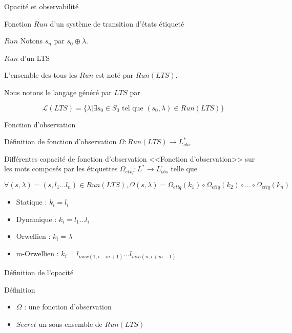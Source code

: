 \documentclass[11pt]{beamer}
\begin{document}
\begin{section}{Opacit\'e et observabilit\'e}
\begin{frame}{Fonction $Run$ d'un syst\`eme de transition d'\'etats \'etiquet\'e}
\begin{block}{$Run$}
	Notons $s_n$ par $s_0\oplus \lambda$.
    \end{block}
    
    \begin{block}{$Run$ d'un LTS}

	L'ensemble des tous les $Run$ est not\'e par $Run(LTS)$.

	Nous notons le langage g\'en\'er\'e par $LTS$ par 

	$$\mathcal{L}(LTS) = \{\lambda | \exists s_0 \in S_0 \mbox{ tel que } (s_0,\lambda) \in Run(LTS)\}$$
   
    \end{block}
  \end{frame}
  
  \begin{frame}{Fonction d'observation}
    \begin{block}{D\'efinition de fonction d'observation}
      $\Omega : Run(LTS) \rightarrow L_{obs}^*$
    \end{block}
    
    \begin{block}{Diff\'erentes capacit\'e de fonction d'observation}
     <<Fonction d'observation>> sur les mots compos\'es par les \'etiquettes $\Omega_{etiq} : L^* \rightarrow L_{obs}^{\varepsilon}$ telle que 
	
	$\forall (s,\lambda)= (s,l_1\dots l_n) \in Run(LTS), \Omega(s,\lambda) = \Omega_{etiq}(k_1)\circ\Omega_{etiq}(k_2)\circ\dots\circ\Omega_{etiq}(k_n)$

      \begin{itemize}
        \item Statique : $k_i = l_i$
	\item Dynamique : $k_i = l_1 \dots l_i$
	\item Orwellien : $k_i = \lambda$
	\item m-Orwellien : $k_i = l_{max(1,i-m+1)} \dots l_{min(n,i+m-1)}$

      \end{itemize}
    \end{block}   
   
  \end{frame}
  
  \begin{frame}{D\'efinition de l'opacit\'e}
    \begin{block}{D\'efinition}
      \begin{itemize}
       \item $\Omega$ : une fonction d'observation 
       \item $Secret$ un sous-ensemble de $Run(LTS)$
      \end{itemize}


\end{block}
\end{frame}
\end{section}
\end{document}
